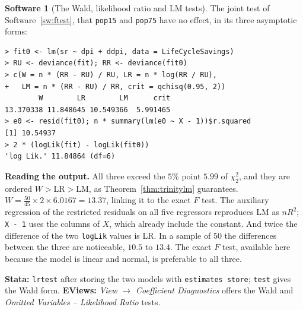 \documentclass[11pt,a4paper]{article}
\numberwithin{equation}{section}
\theoremstyle{definition}
\newtheorem{software}[thm]{Software}
\begin{document}
\begin{software}[The Wald, likelihood ratio and LM tests]
\label{sw:trinity}
The joint test of Software~\ref{sw:ftest}, that \texttt{pop15} and \texttt{pop75} have no effect, in its three asymptotic forms:
{\small\begin{verbatim}
> fit0 <- lm(sr ~ dpi + ddpi, data = LifeCycleSavings)
> RU <- deviance(fit); RR <- deviance(fit0)
> c(W = n * (RR - RU) / RU, LR = n * log(RR / RU),
+   LM = n * (RR - RU) / RR, crit = qchisq(0.95, 2))
        W        LR        LM      crit
13.370338 11.848645 10.549366  5.991465
> e0 <- resid(fit0); n * summary(lm(e0 ~ X - 1))$r.squared
[1] 10.54937
> 2 * (logLik(fit) - logLik(fit0))
'log Lik.' 11.84864 (df=6)
\end{verbatim}}
\textbf{Reading the output.} All three exceed the $5\%$ point $5.99$ of $\chi^2_2$, and they are ordered $W > \text{LR} > \text{LM}$, as Theorem~\ref{thm:trinitylm} guarantees.
$W = \frac{50}{45} \times 2 \times 6.0167 = 13.37$, linking it to the exact $F$ test. The auxiliary regression of the restricted residuals on all five regressors
reproduces LM as $nR^2$; \texttt{X - 1} uses the columns of $X$, which already include the constant. And twice the difference of the two
\texttt{logLik} values is LR. In a sample of $50$ the differences between the three are noticeable, $10.5$ to $13.4$. The exact $F$ test, available
here because the model is linear and normal, is preferable to all three.

\textbf{Stata:} \texttt{lrtest} after storing the two models with \texttt{estimates store}; \texttt{test} gives the Wald form. \textbf{EViews:}
\emph{View $\to$ Coefficient Diagnostics} offers the Wald and \emph{Omitted Variables -- Likelihood Ratio} tests.
\end{software}
\end{document}
